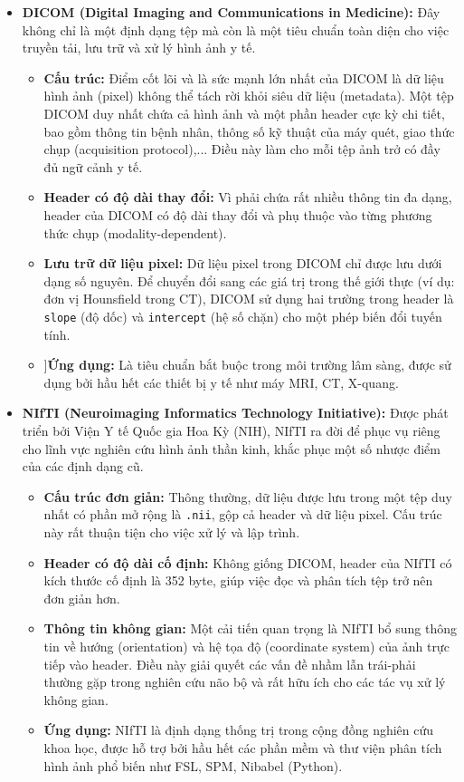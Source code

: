 \begin{itemize}
    \item \textbf{DICOM (Digital Imaging and Communications in Medicine):} 
    Đây không chỉ là một định dạng tệp mà còn là một tiêu chuẩn toàn diện cho việc truyền tải, lưu trữ và xử lý hình ảnh y tế. 
    \begin{itemize}
        \item[$\circ$]  \textbf{Cấu trúc:} Điểm cốt lõi và là sức mạnh lớn nhất của DICOM là dữ liệu hình ảnh (pixel) không thể tách rời khỏi siêu dữ liệu (metadata). Một tệp DICOM duy nhất chứa cả hình ảnh và một phần header cực kỳ chi tiết, bao gồm thông tin bệnh nhân, thông số kỹ thuật của máy quét, giao thức chụp (acquisition protocol),... Điều này làm cho mỗi tệp ảnh trở có đầy đủ ngữ cảnh y tế.
        \item[$\circ$]  \textbf{Header có độ dài thay đổi:} Vì phải chứa rất nhiều thông tin đa dạng, header của DICOM có độ dài thay đổi và phụ thuộc vào từng phương thức chụp (modality-dependent).
        \item[$\circ$]  \textbf{Lưu trữ dữ liệu pixel:} Dữ liệu pixel trong DICOM chỉ được lưu dưới dạng số nguyên. Để chuyển đổi sang các giá trị trong thế giới thực (ví dụ: đơn vị Hounsfield trong CT), DICOM sử dụng hai trường trong header là \texttt{slope} (độ dốc) và \texttt{intercept} (hệ số chặn) cho một phép biến đổi tuyến tính.
        \item[$\circ$]]\textbf{Ứng dụng:} Là tiêu chuẩn bắt buộc trong môi trường lâm sàng, được sử dụng bởi hầu hết các thiết bị y tế như máy MRI, CT, X-quang.
    \end{itemize}
    
    \item \textbf{NIfTI (Neuroimaging Informatics Technology Initiative):} 
    Được phát triển bởi Viện Y tế Quốc gia Hoa Kỳ (NIH), NIfTI ra đời để phục vụ riêng cho lĩnh vực nghiên cứu hình ảnh thần kinh, khắc phục một số nhược điểm của các định dạng cũ.
    \begin{itemize}
        \item[$\circ$] \textbf{Cấu trúc đơn giản:} Thông thường, dữ liệu được lưu trong một tệp duy nhất có phần mở rộng là \texttt{.nii}, gộp cả header và dữ liệu pixel. Cấu trúc này rất thuận tiện cho việc xử lý và lập trình.
        \item[$\circ$] \textbf{Header có độ dài cố định:} Không giống DICOM, header của NIfTI có kích thước cố định là 352 byte, giúp việc đọc và phân tích tệp trở nên đơn giản hơn.
        \item[$\circ$] \textbf{Thông tin không gian:} Một cải tiến quan trọng là NIfTI bổ sung thông tin về hướng (orientation) và hệ tọa độ (coordinate system) của ảnh trực tiếp vào header. Điều này giải quyết các vấn đề nhầm lẫn trái-phải thường gặp trong nghiên cứu não bộ và rất hữu ích cho các tác vụ xử lý không gian.
        \item[$\circ$] \textbf{Ứng dụng:} NIfTI là định dạng thống trị trong cộng đồng nghiên cứu khoa học, được hỗ trợ bởi hầu hết các phần mềm và thư viện phân tích hình ảnh phổ biến như FSL, SPM, Nibabel (Python).
    \end{itemize}
\end{itemize}
